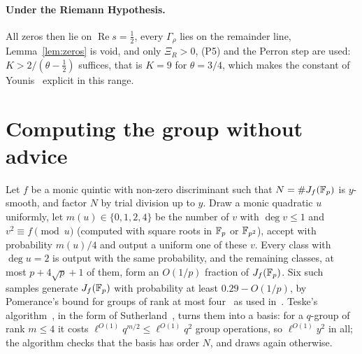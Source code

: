 \paragraph{Under the Riemann Hypothesis.}
All zeros then lie on $\operatorname{Re}s=\tfrac12$, every $\Gamma_\rho$ lies on the remainder line,
Lemma~\ref{lem:zeros} is void, and only $\Xi_R>0$, (P5) and the Perron step are used: $K>2/(\theta-\tfrac12)$
suffices, that is $K=9$ for $\theta=3/4$, which makes the constant of Younis~\cite[Thm.~1.3]{You24} explicit in
this range.

\section{Computing the group without advice}\label{app:basis}
Let $f$ be a monic quintic with non-zero discriminant such that $N=\#J_f(\mathbb{F}_p)$ is $y$-smooth, and factor $N$
by trial division up to $y$. Draw a monic quadratic $u$ uniformly, let $m(u)\in\{0,1,2,4\}$ be the number of $v$ with
$\deg v\le1$ and $v^2\equiv f\pmod u$ (computed with square roots in $\mathbb{F}_p$ or $\mathbb{F}_{p^2}$), accept with
probability $m(u)/4$ and output a uniform one of these $v$. Every class with $\deg u=2$ is output with the
same probability, and the remaining classes, at most $p+4\sqrt p+1$ of them, form an $O(1/p)$ fraction of
$J_f(\mathbb{F}_p)$. Six such samples generate $J_f(\mathbb{F}_p)$ with probability at least $0.29-O(1/p)$, by Pomerance's
bound for groups of rank at most four~\cite{Pom02} as used in~\cite[\S7]{KMS10}. Teske's
algorithm~\cite[Thm.~6.1]{Tes99}, in the form of Sutherland~\cite[\S1]{Sut11}, turns them into a basis: for a
$q$-group of rank $m\le4$ it costs $\ell^{O(1)}q^{m/2}\le\ell^{O(1)}q^2$ group operations, so $\ell^{O(1)}y^2$ in
all; the algorithm checks that the basis has order $N$, and draws again otherwise.
